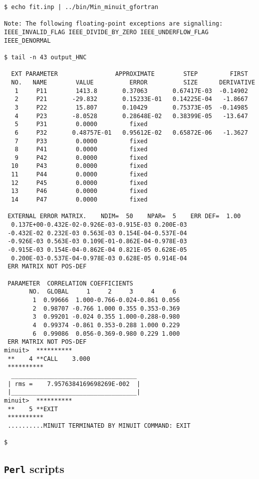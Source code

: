 \documentclass[a4paper,12pt,captions=tableheading]{article}
\begin{document}
\begin{verbatim}
$ echo fit.inp | ../bin/Min_minuit_gfortran

Note: The following floating-point exceptions are signalling: IEEE_INVALID_FLAG IEEE_DIVIDE_BY_ZERO IEEE_UNDERFLOW_FLAG IEEE_DENORMAL

$ tail -n 43 output_HNC

  EXT PARAMETER                APPROXIMATE        STEP         FIRST   
  NO.   NAME        VALUE          ERROR          SIZE      DERIVATIVE 
   1     P11        1413.8       0.37063       0.67417E-03  -0.14902    
   2     P21       -29.832       0.15233E-01   0.14225E-04   -1.8667    
   3     P22        15.807       0.10429       0.75373E-05  -0.14985    
   4     P23       -8.0528       0.28648E-02   0.38399E-05   -13.647    
   5     P31        0.0000         fixed    
   6     P32       0.48757E-01   0.95612E-02   0.65872E-06   -1.3627    
   7     P33        0.0000         fixed    
   8     P41        0.0000         fixed    
   9     P42        0.0000         fixed    
  10     P43        0.0000         fixed    
  11     P44        0.0000         fixed    
  12     P45        0.0000         fixed    
  13     P46        0.0000         fixed    
  14     P47        0.0000         fixed    

 EXTERNAL ERROR MATRIX.    NDIM=  50    NPAR=  5    ERR DEF=  1.00    
  0.137E+00-0.432E-02-0.926E-03-0.915E-03 0.200E-03
 -0.432E-02 0.232E-03 0.563E-03 0.154E-04-0.537E-04
 -0.926E-03 0.563E-03 0.109E-01-0.862E-04-0.978E-03
 -0.915E-03 0.154E-04-0.862E-04 0.821E-05 0.628E-05
  0.200E-03-0.537E-04-0.978E-03 0.628E-05 0.914E-04
 ERR MATRIX NOT POS-DEF

 PARAMETER  CORRELATION COEFFICIENTS
       NO.  GLOBAL     1     2     3     4     6
        1  0.99666  1.000-0.766-0.024-0.861 0.056
        2  0.98707 -0.766 1.000 0.355 0.353-0.369
        3  0.99201 -0.024 0.355 1.000-0.288-0.980
        4  0.99374 -0.861 0.353-0.288 1.000 0.229
        6  0.99086  0.056-0.369-0.980 0.229 1.000
 ERR MATRIX NOT POS-DEF
minuit>  **********
 **    4 **CALL    3.000    
 **********
  ___________________________________ 
 | rms =    7.9576384169698269E-002  |
 |___________________________________|
minuit>  **********
 **    5 **EXIT 
 **********
 ..........MINUIT TERMINATED BY MINUIT COMMAND: EXIT 

$
\end{verbatim}

\subsection{\texttt{Perl} scripts}
\label{sec-3-3}



\printbibliography
\end{document}
